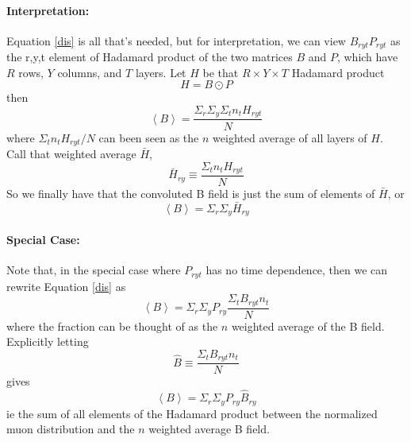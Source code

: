 \documentclass[twoside]{article}
\begin{document}
\paragraph{Interpretation:}
Equation \ref{dis}  is all that's needed, but for interpretation, we can view $B_{ryt} P_{ryt}$ as the {r,y,t} element of Hadamard product of the two matrices $B$ and $P$, which have $R$ rows, $Y$ columns, and $T$ layers. Let $H$ be that $R \times Y \times T$  Hadamard product
\begin{equation}
H = B \odot P
\end{equation}
then
\begin{equation}
\left\langle B \right\rangle = \frac{  \Sigma_r \Sigma_y \Sigma_t  n_t  H_{ryt} }  {N}
\end{equation}
where $\Sigma_t  n_t  H_{ryt}/N$ can been seen as the $n$ weighted average of all layers of $H$. Call that weighted average $\bar{H} $,
\begin{equation}
\bar{H}_{ry} \equiv \frac{ \Sigma_t  n_t  H_{ryt} }  {N}
\end{equation}
So we finally have that the convoluted B field is just the sum of elements of $\bar{H}$, or
\begin{equation}
\boxed{
\left\langle B \right\rangle =  \Sigma_r \Sigma_y \bar{H}_{ry}
}
\end{equation}

\paragraph{Special Case:}
Note that, in the special case where $P_{ryt}$ has no time dependence, then we can rewrite Equation \ref{dis} as 
\begin{equation}
\left\langle B \right\rangle =  \Sigma_r \Sigma_y P_{ry} \frac{\Sigma_t B_{ryt} n_t }  {N}
\end{equation}
where the fraction can be thought of as the $n$ weighted average of the B field. Explicitly  letting
\begin{equation}
\hat{B} \equiv \frac{\Sigma_t B_{ryt} n_t }  {N}
\end{equation}
gives
\begin{equation}
\boxed{
\left\langle B \right\rangle =  \Sigma_r \Sigma_y P_{ry} \hat{B}_{ry}
}
\end{equation}
ie the sum of all elements of the Hadamard product between the normalized muon distribution and the $n$ weighted average B field.
\end{document}
